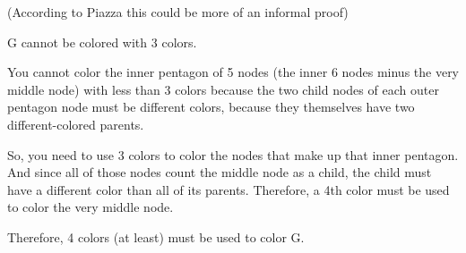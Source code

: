 \documentclass{6042}
\begin{document}

(According to Piazza this could be more of an informal proof)

G cannot be colored with 3 colors.

You cannot color the inner pentagon of 5 nodes (the inner 6 nodes minus the very middle node) with less than 3 colors because
the two child nodes of each outer pentagon node must be different colors, because they themselves have two different-colored parents.

So, you need to use 3 colors to color the nodes that make up that inner pentagon. And since all of those nodes count the middle node as a child,
the child must have a different color than all of its parents. Therefore, a 4th color must be used to color the very middle node.

Therefore, 4 colors (at least) must be used to color G.
\end{document}
